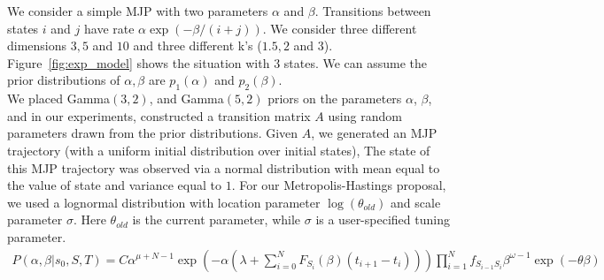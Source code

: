 \noindent We consider a simple MJP with two parameters $\alpha$ and $\beta$. Transitions between states $i$ and $j$ have rate $\alpha \exp(-\beta/(i+j))$.
We consider three different dimensions $3, 5$ and $10$ and three different k's ($1.5, 2$ and $3$). 
Figure~\ref{fig:exp_model} shows the situation with $3$ states.  We can assume the prior distributions of $\alpha, \beta$ are $p_1(\alpha)$ and $p_2(\beta)$.\\
We placed Gamma$(3,2)$, and Gamma$(5, 2)$ priors on the parameters $\alpha$, $\beta$, and in our experiments, constructed a transition matrix $A$ using random
parameters drawn from the prior distributions. Given $A$, we generated an MJP trajectory (with a uniform initial distribution over initial states),
The state of this MJP trajectory was observed via a normal distribution with mean equal to the value of state and variance equal to $1$.
For our Metropolis-Hastings proposal, we used a lognormal distribution with location parameter $\log(\theta_{old})$ and scale parameter $\sigma$. Here
$\theta_{old}$ is the current parameter, while $\sigma$ is a user-specified tuning parameter.
\begin{align*}
P(\alpha, \beta | s_0, S, T ) = C \alpha^{\mu + N - 1}\exp(-\alpha (\lambda + \sum_{i = 0}^{N} F_{S_i}(\beta)(t_{i + 1} - t_i))) \prod_{i = 1}^N f_{S_{i - 1}S_i}  \beta ^{\omega - 1} \exp(-\theta \beta)\\
\end{align*}
